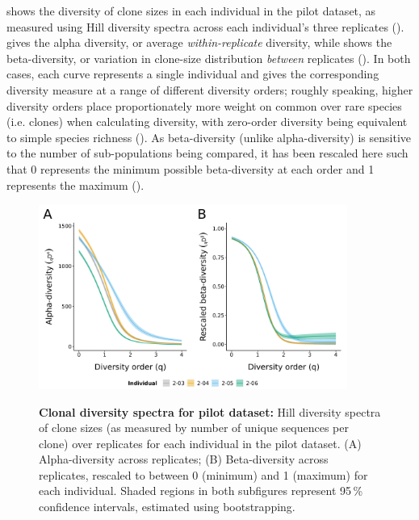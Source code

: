  shows the diversity of clone sizes in each individual in the pilot dataset, as measured using Hill diversity spectra across each individual's three replicates ().  gives the alpha diversity, or average \textit{within-replicate} diversity, while  shows the beta-diversity, or variation in clone-size distribution \textit{between} replicates (). In both cases, each curve represents a single individual and gives the corresponding diversity measure at a range of different diversity orders; roughly speaking, higher diversity orders place proportionately more weight on common over rare species (i.e. clones) when calculating diversity, with zero-order diversity being equivalent to simple species richness (). As beta-diversity (unlike alpha-diversity) is sensitive to the number of sub-populations being compared, it has been rescaled here such that 0 represents the minimum possible beta-diversity at each order and 1 represents the maximum ().

\begin{figure}
\centering
\includegraphics[width = 0.9\textwidth]{_Figures/png/pilot-clone-diversity}
\begin{subfigure}{0em}
\label{fig:igseq-pilot-clone-diversity-alpha}
\end{subfigure}
\begin{subfigure}{0em}
\label{fig:igseq-pilot-clone-diversity-beta}
\end{subfigure}
\caption{\textbf{Clonal diversity spectra for pilot dataset:} Hill diversity spectra of clone sizes (as measured by number of unique sequences per clone) over replicates for each individual in the pilot dataset. (A) Alpha-diversity across replicates; (B) Beta-diversity across replicates, rescaled to between 0 (minimum) and 1 (maximum) for each individual. Shaded regions in both subfigures represent 95\,\% confidence intervals, estimated using bootstrapping.} %
\label{fig:igseq-pilot-clone-diversity}
\end{figure}

